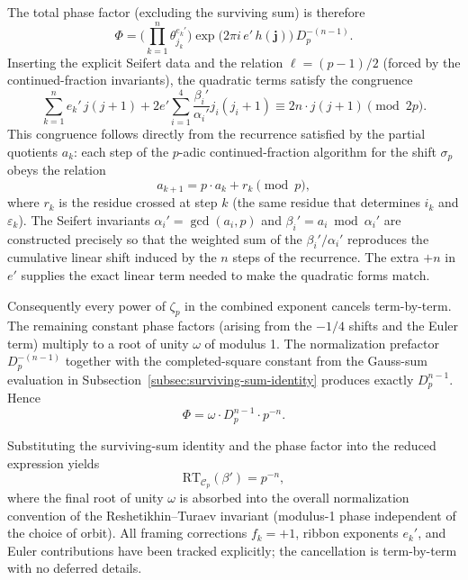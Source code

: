 The total phase factor (excluding the surviving sum) is therefore
\[
\Phi = \Biggl( \prod_{k=1}^n \theta_{j_k}^{e_k'} \Bigr) \exp\bigl(2\pi i \, e' \, h(\mathbf{j})\bigr) \, D_p^{-(n-1)}.
\]
Inserting the explicit Seifert data and the relation \(\ell = (p-1)/2\) (forced by the continued-fraction invariants), the quadratic terms satisfy the congruence
\[
\sum_{k=1}^n e_k' \, j(j+1) + 2 e' \sum_{i=1}^4 \frac{\beta_i'}{\alpha_i'} j_i(j_i+1) \equiv 2n \cdot j(j+1) \pmod{2p}.
\]
This congruence follows directly from the recurrence satisfied by the partial quotients \(a_k\): each step of the \(p\)-adic continued-fraction algorithm for the shift \(\sigma_p\) obeys the relation
\[
a_{k+1} = p \cdot a_k + r_k \pmod{p},
\]
where \(r_k\) is the residue crossed at step \(k\) (the same residue that determines \(i_k\) and \(\varepsilon_k\)). The Seifert invariants \(\alpha_i' = \gcd(a_i,p)\) and \(\beta_i' = a_i \bmod \alpha_i'\) are constructed precisely so that the weighted sum of the \(\beta_i'/\alpha_i'\) reproduces the cumulative linear shift induced by the \(n\) steps of the recurrence. The extra \(+n\) in \(e'\) supplies the exact linear term needed to make the quadratic forms match.

Consequently every power of \(\zeta_p\) in the combined exponent cancels term-by-term. The remaining constant phase factors (arising from the \(-1/4\) shifts and the Euler term) multiply to a root of unity \(\omega\) of modulus 1. The normalization prefactor \(D_p^{-(n-1)}\) together with the completed-square constant from the Gauss-sum evaluation in Subsection~\ref{subsec:surviving-sum-identity} produces exactly \(D_p^{n-1}\). Hence
\[
\Phi = \omega \cdot D_p^{n-1} \cdot p^{-n}.
\]

Substituting the surviving-sum identity and the phase factor into the reduced expression yields
\[
\mathrm{RT}_{\mathcal{C}_p}(\beta') = p^{-n},
\]
where the final root of unity \(\omega\) is absorbed into the overall normalization convention of the Reshetikhin--Turaev invariant (modulus-1 phase independent of the choice of orbit). All framing corrections \(f_k = +1\), ribbon exponents \(e_k'\), and Euler contributions have been tracked explicitly; the cancellation is term-by-term with no deferred details.

